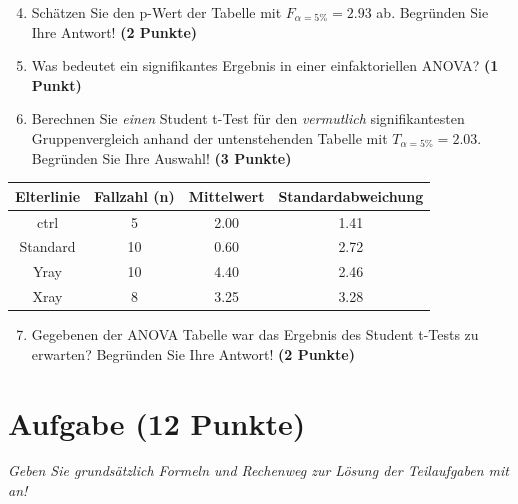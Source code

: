 \documentclass[a4paper, 9pt]{scrartcl}\usepackage[]{graphicx}\usepackage[]{xcolor}
\newenvironment{knitrout}{}{} %
\begin{document}
\vspace{1Ex}

\begin{enumerate}
  \setcounter{enumi}{3}
\item Schätzen Sie den p-Wert der Tabelle mit $F_{\alpha = 5\%} = 2.93$ ab. Begründen Sie Ihre Antwort! \textbf{(2 Punkte)}
\item Was bedeutet ein signifikantes Ergebnis in einer einfaktoriellen ANOVA? \textbf{(1 Punkt)}
\item Berechnen Sie \textit{einen} Student t-Test für den \textit{vermutlich} signifikantesten Gruppenvergleich anhand der untenstehenden Tabelle mit $T_{\alpha = 5\%} = 2.03$. Begründen Sie Ihre Auswahl! \textbf{(3 Punkte)}
\end{enumerate}


\begin{knitrout}
\color{fgcolor}\begin{table}[!h]
\centering\begingroup\fontsize{11}{13}\selectfont

\begin{tabular}{cccc}
\toprule
\textbf{Elterlinie} & \textbf{Fallzahl (n)} & \textbf{Mittelwert} & \textbf{Standardabweichung}\\
\midrule
ctrl & 5 & 2.00 & 1.41\\
Standard & 10 & 0.60 & 2.72\\
Yray & 10 & 4.40 & 2.46\\
Xray & 8 & 3.25 & 3.28\\
\bottomrule
\end{tabular}
\endgroup{}
\end{table}

\end{knitrout}


\begin{enumerate}
  \setcounter{enumi}{6}
\item Gegebenen der ANOVA Tabelle war das Ergebnis des Student t-Tests zu erwarten? Begründen Sie Ihre Antwort! \textbf{(2 Punkte)}
\end{enumerate}

 
\clearpage

\section{Aufgabe \hfill (12 Punkte)}

\textit{Geben Sie grundsätzlich Formeln und Rechenweg zur Lösung der Teilaufgaben mit an!} \\[1Ex]
 
\end{document}
